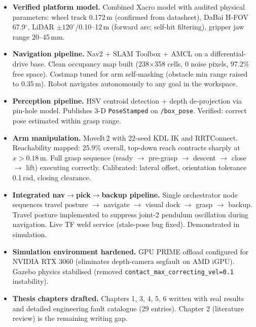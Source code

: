 \documentclass[11pt,a4paper]{article}
\begin{document}
\begin{itemize}[label=\checkmark, leftmargin=1.5em, itemsep=0.5em]
    \item \textbf{Verified platform model.} Combined Xacro model with audited physical
    parameters: wheel track 0.172\,m (confirmed from datasheet), DaBai H-FOV
    67.9$^\circ$, LiDAR $\pm120^\circ$/0.10--12\,m (forward arc; self-hit filtering),
    gripper jaw range 20--45\,mm.

    \item \textbf{Navigation pipeline.} Nav2 + SLAM Toolbox + AMCL on a differential-
    drive base. Clean occupancy map built (238$\times$358 cells, 0 noise pixels, 97.2\%
    free space). Costmap tuned for arm self-masking (obstacle min range raised to
    0.35\,m). Robot navigates autonomously to any goal in the workspace.

    \item \textbf{Perception pipeline.} HSV centroid detection + depth de-projection
    via pin-hole model. Publishes 3-D \texttt{PoseStamped} on \texttt{/box\_pose}.
    Verified: correct pose estimated within grasp range.

    \item \textbf{Arm manipulation.} MoveIt\,2 with 22-seed KDL IK and RRTConnect.
    Reachability mapped: 25.9\% overall, top-down reach contracts sharply at
    $x > 0.18$\,m. Full grasp sequence (ready $\to$ pre-grasp $\to$ descent $\to$
    close $\to$ lift) executing correctly. Calibrated: lateral offset, orientation
    tolerance 0.1\,rad, closing clearance.

    \item \textbf{Integrated nav$\to$pick$\to$backup pipeline.} Single orchestrator
    node sequences travel posture $\to$ navigate $\to$ visual dock $\to$ grasp $\to$
    backup. Travel posture implemented to suppress joint-2 pendulum oscillation during
    navigation. Live TF weld service (stale-pose bug fixed). Demonstrated in simulation.

    \item \textbf{Simulation environment hardened.} GPU PRIME offload configured for
    NVIDIA RTX 3060 (eliminates depth-camera segfault on AMD iGPU). Gazebo physics
    stabilised (removed \texttt{contact\_max\_correcting\_vel=0.1} instability).

    \item \textbf{Thesis chapters drafted.} Chapters 1, 3, 4, 5, 6 written with real
    results and detailed engineering fault catalogue (29 entries). Chapter 2 (literature
    review) is the remaining writing gap.
\end{itemize}
\end{document}
